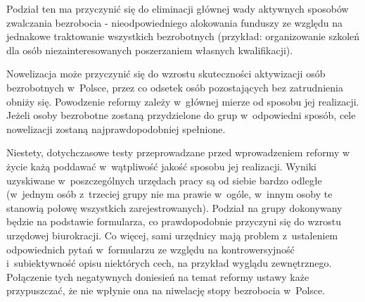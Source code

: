 \documentclass[12pt]{article}
\begin{document}
    Podział ten ma przyczynić się do eliminacji głównej wady aktywnych sposobów zwalczania bezrobocia - nieodpowiedniego alokowania funduszy ze względu na jednakowe traktowanie wszystkich bezrobotnych (przykład: organizowanie szkoleń dla osób niezainteresowanych poszerzaniem własnych kwalifikacji). 
    
    Nowelizacja może przyczynić się do wzrostu skuteczności aktywizacji osób bezrobotnych w~Polsce, przez co odsetek osób pozostających bez zatrudnienia obniży się. Powodzenie reformy zależy w~głównej mierze od sposobu jej realizacji. Jeżeli osoby bezrobotne zostaną przydzielone do grup w~odpowiedni sposób, cele nowelizacji zostaną najprawdopodobniej spełnione. 
    
    Niestety, dotychczasowe testy przeprowadzane przed wprowadzeniem reformy w życie każą poddawać w~wątpliwość jakość sposobu jej realizacji. Wyniki uzyskiwane w~poszczególnych urzędach pracy są od siebie bardzo odległe (w~jednym osób z~trzeciej grupy nie ma prawie w~ogóle, w~innym osoby te stanowią połowę wszystkich zarejestrowanych). Podział na grupy dokonywany będzie na podstawie formularza, co prawdopodobnie przyczyni się do wzrostu urzędowej biurokracji. Co więcej, sami urzędnicy mają problem z~ustaleniem odpowiednich pytań w~formularzu ze względu na kontrowersyjność i~subiektywność opisu niektórych cech, na przykład wyglądu zewnętrznego. Połączenie tych negatywnych doniesień na temat reformy ustawy każe przypuszczać, że nie wpłynie ona na niwelację stopy bezrobocia w~Polsce.

    
    
\end{document}
